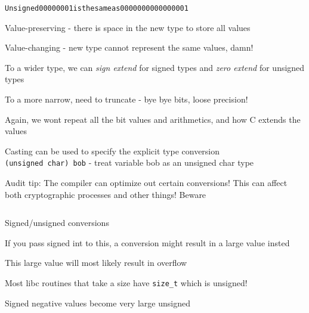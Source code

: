 \documentclass[Screen16to9,17pt]{foils}
\begin{document}

\begin{alltt}
Unsigned 00000001 is the same as 0000000000000001
\end{alltt}

\begin{list2}
\item Value-preserving - there is space in the new type to store all values
\item Value-changing - new type cannot represent the same values, damn!
\item To a wider type, we can \emph{sign extend} for signed types and \emph{zero extend} for unsigned types
\item To a more narrow, need to truncate - bye bye bits, loose precision!
\item Again, we wont repeat all the bit values and arithmetics, and how C extends the values
\item Casting can be used to specify the explicit type conversion\\ \verb+(unsigned char) bob+ - treat variable bob as an unsigned char type
\end{list2}

Audit tip: The compiler can optimize out certain conversions! This can affect both cryptographic processes and other things! Beware




\inputminted{c}{programs/conversion1.c}

\begin{list2}
\item Signed/unsigned conversions
\item If you pass signed int to this, a conversion might result in a large value insted
\item This large value will most likely result in overflow
\item Most libc routines that take a size have \verb+size_t+ which is unsigned!
\item Signed negative values become very large unsigned
\end{list2}





\end{document}
